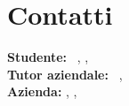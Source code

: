 \section*{Contatti}
\textbf{Studente:} \nomeStudente\ \cognomeStudente, \href{mailto:\emailStudente}{\emailStudente}, \telStudente \\
\textbf{Tutor aziendale:} \nomeTutorAziendale\ \cognomeTutorAziendale, \href{mailto:\emailTutorAziendale}{\emailTutorAziendale} \\ %
\textbf{Azienda:} \ragioneSocAzienda, \indirizzoAzienda, \href{\sitoAzienda}{\sitoAzienda}